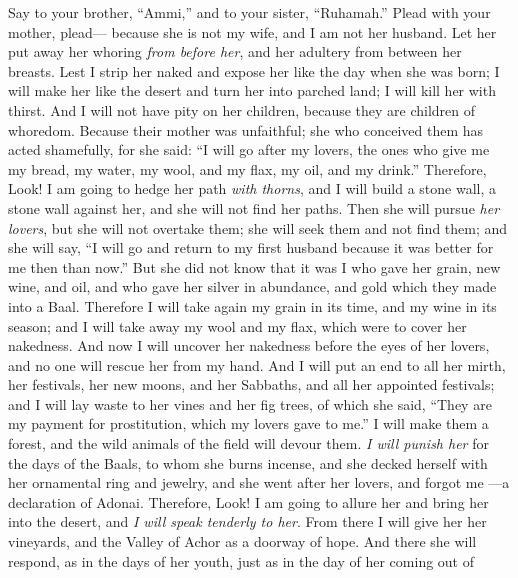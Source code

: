 \begin{biblechapter} %
 Say to your brother, “Ammi,” 
and to your sister, “Ruhamah.”
\verse Plead with your mother, plead— 
because she is not my wife, 
and I am not her husband. 
Let her put away her whoring \textit{from before her}, 
and her adultery from between her breasts.
\verse Lest I strip her naked 
and expose her like the day when she was born; 
I will make her like the desert 
and turn her into parched land; 
I will kill her with thirst.
\verse And I will not have pity on her children, 
because they are children of whoredom.
\verse Because their mother was unfaithful; 
she who conceived them has acted shamefully, 
for she said: 
“I will go after my lovers, 
the ones who give me my bread, my water, 
my wool, and my flax, 
my oil, and my drink.”
\verse Therefore, Look! 
I am going to hedge her path \textit{with thorns}, 
and I will build a stone wall, a stone wall against her, 
and she will not find her paths.
\verse Then she will pursue \textit{her lovers}, 
but she will not overtake them; 
she will seek them and not find them; 
and she will say, “I will go 
and return to my first husband 
because it was better for me then than now.”
\verse But she did not know 
that it was I who gave her 
grain, new wine, and oil, 
and who gave her silver in abundance, 
and gold which they made into a Baal.
\verse Therefore I will take again 
my grain in its time, 
and my wine in its season; 
and I will take away my wool and my flax, 
which were to cover her nakedness.
\verse And now I will uncover her nakedness 
before the eyes of her lovers, 
and no one will rescue her from my hand.
\verse And I will put an end to all her mirth, 
her festivals, her new moons, and her Sabbaths, 
and all her appointed festivals;
\verse and I will lay waste to her vines and her fig trees, 
of which she said, 
“They are my payment for prostitution, 
which my lovers gave to me.” 
I will make them a forest, 
and the wild animals of the field will devour them.
\verse \textit{I will punish her} for the days of the Baals, 
to whom she burns incense, 
and she decked herself with her ornamental ring and jewelry, 
and she went after her lovers, and forgot me 
—a declaration of Adonai.
\verse Therefore, Look! I am going to allure her 
and bring her into the desert, 
and \textit{I will speak tenderly to her}.
\verse From there I will give her 
her vineyards, 
and the Valley of Achor as a doorway of hope. 
And there she will respond, 
as in the days of her youth, 
just as in the day of her coming out of 

\end{biblechapter}
